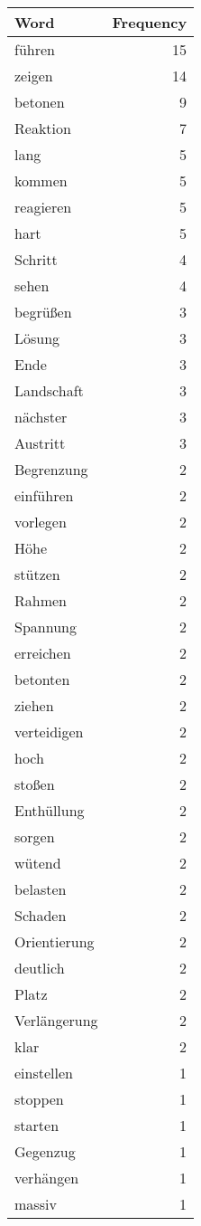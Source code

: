\begin{tabular}{lr}
\toprule
Word & Frequency \\
\midrule
führen & 15 \\
zeigen & 14 \\
betonen & 9 \\
Reaktion & 7 \\
lang & 5 \\
kommen & 5 \\
reagieren & 5 \\
hart & 5 \\
Schritt & 4 \\
sehen & 4 \\
begrüßen & 3 \\
Lösung & 3 \\
Ende & 3 \\
Landschaft & 3 \\
nächster & 3 \\
Austritt & 3 \\
Begrenzung & 2 \\
einführen & 2 \\
vorlegen & 2 \\
Höhe & 2 \\
stützen & 2 \\
Rahmen & 2 \\
Spannung & 2 \\
erreichen & 2 \\
betonten & 2 \\
ziehen & 2 \\
verteidigen & 2 \\
hoch & 2 \\
stoßen & 2 \\
Enthüllung & 2 \\
sorgen & 2 \\
wütend & 2 \\
belasten & 2 \\
Schaden & 2 \\
Orientierung & 2 \\
deutlich & 2 \\
Platz & 2 \\
Verlängerung & 2 \\
klar & 2 \\
einstellen & 1 \\
stoppen & 1 \\
starten & 1 \\
Gegenzug & 1 \\
verhängen & 1 \\
massiv & 1 \\

\end{tabular}
